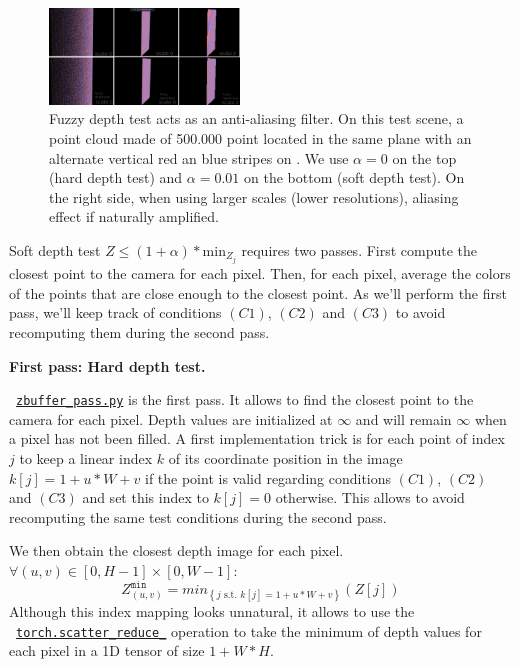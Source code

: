 \begin{figure}[H]
    \centering
    \includegraphics[width=0.45\textwidth]{figures/fuzzy_depth_test_aliasing_large.png}
    \caption{Fuzzy depth test acts as an anti-aliasing filter. On this test scene, a point cloud made of 500.000 point located in the same plane with an alternate vertical red an blue stripes on . We use $\alpha=0$ on the top (hard depth test) and $\alpha=0.01$ on the bottom (soft depth test). On the right side, when using larger scales (lower resolutions), aliasing effect if naturally amplified.}
    \label{fig:fuzzy_depth_test_AA}
\end{figure}

\noindent Soft depth test $Z \leq (1 + \alpha) * \textrm{min}_{Z_{j}}$ requires two passes. First compute the closest point to the camera for each pixel. Then, for each pixel, average the colors of the points that are close enough to the closest point. As we'll perform the first pass, we'll keep track of conditions $(C1)$, $(C2)$ and $(C3)$ to avoid recomputing them during the second pass.

\noindent \textbf{First pass: Hard depth test.}

\noindent ~\href{https://github.com/balthazarneveu/per-pixel-point-rendering/blob/main/src/pixr/rendering/zbuffer\_pass.py#L5}{\texttt{zbuffer\_pass.py}} is the first pass. It allows to find the closest point to the camera for each pixel. Depth values are initialized at $\infty$ and will remain $\infty$ when a pixel has not been filled. A first implementation trick is for each point of index $j$ to keep a linear index $k$ of its coordinate position in the image $k[j] = 1+ u*W+v$ if the point is valid regarding conditions $(C1)$, $(C2)$ and $(C3)$ and set this index to $k[j]=0$ otherwise. This allows to avoid recomputing the same test conditions during the second pass.

We then obtain the closest depth image for each pixel. $\forall (u,v) \in \left[0, H-1\right] \times \left[0, W-1\right]$:
$$Z^{\texttt{min}}_{(u,v)} = min_{\left\{j  \text{ s.t. } k[j]=1+u*W+v\right\}} \left(Z[j]\right)$$
\noindent Although this index mapping looks unnatural, it allows to use the ~\href{https://pytorch.org/docs/stable/generated/torch.Tensor.scatter\_reduce\_.html#torch.Tensor.scatter\_reduce\_}{\texttt{torch.scatter\_reduce\_}} operation to take the minimum of depth values for each pixel in a 1D tensor of size $1+W*H$.

